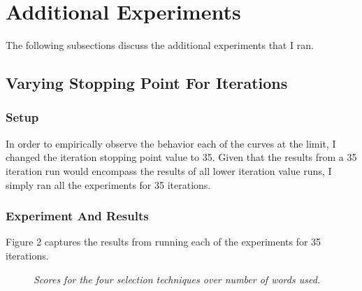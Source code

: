 \documentclass{article} %
\begin{document}
\section{Additional Experiments}

The following subsections discuss the additional experiments that I ran.

\subsection{Varying Stopping Point For Iterations}

\subsubsection{Setup}

In order to empirically observe the behavior each of the curves at the limit, I changed the iteration stopping point value to 35. Given that the results from a 35 iteration run would encompass the results of all lower iteration value runs, I simply ran all the experiments for 35 iterations. 

\subsubsection{Experiment And Results}

Figure 2 captures the results from running each of the experiments for 35 iterations. 

\begin{figure}[h]%
	\centering
    \caption{\textit{Scores for the four selection techniques over number of words used.}}
    \label{fig:default}
\end{figure}
\end{document}
